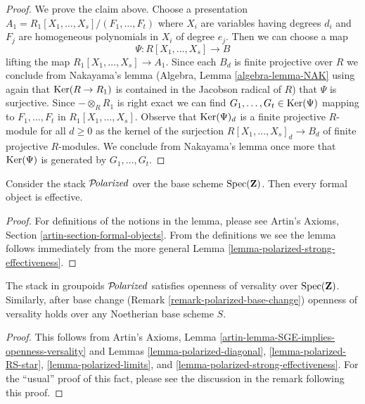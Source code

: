 \begin{proof}
\medskip\noindent
We prove the claim above.
Choose a presentation $A_1 = R_1[X_1, \ldots, X_s]/(F_1, \ldots, F_t)$
where $X_i$ are variables having degrees $d_i$ and $F_j$
are homogeneous polynomials in $X_i$ of degree $e_j$.
Then we can choose a map
$$
\Psi : R[X_1, \ldots, X_s] \longrightarrow B
$$
lifting the map $R_1[X_1, \ldots, X_s] \to A_1$. Since each $B_d$
is finite projective over $R$ we conclude from 
Nakayama's lemma (Algebra, Lemma \ref{algebra-lemma-NAK}
using again that $\mathop{\mathrm{Ker}}(R \to R_1)$ is contained in the Jacobson radical
of $R$) that $\Psi$ is surjective. Since $- \otimes_R R_1$ is right
exact we can find $G_1, \ldots, G_t \in \mathop{\mathrm{Ker}}(\Psi)$
mapping to $F_1, \ldots, F_t$ in $R_1[X_1, \ldots, X_s]$.
Observe that $\mathop{\mathrm{Ker}}(\Psi)_d$ is a finite projective $R$-module
for all $d \geq 0$ as the kernel of the surjection
$R[X_1, \ldots, X_s]_d \to B_d$ of finite projective $R$-modules.
We conclude from Nakayama's lemma once more that 
$\mathop{\mathrm{Ker}}(\Psi)$ is generated by $G_1, \ldots, G_t$.
\end{proof}

\begin{lemma}
\label{lemma-polarized-existence}
Consider the stack $\mathcal{P}\!\mathit{olarized}$ over the base
scheme $\mathop{\mathrm{Spec}}(\mathbf{Z})$. Then every formal object is effective.
\end{lemma}

\begin{proof}
For definitions of the notions in the lemma, please see
Artin's Axioms, Section \ref{artin-section-formal-objects}.
From the definitions we see the lemma follows immediately
from the more general Lemma \ref{lemma-polarized-strong-effectiveness}.
\end{proof}

\begin{lemma}
\label{lemma-polarized-defo-thy}
The stack in groupoids $\mathcal{P}\!\mathit{olarized}$
satisfies openness of versality over $\mathop{\mathrm{Spec}}(\mathbf{Z})$.
Similarly, after base change (Remark \ref{remark-polarized-base-change})
openness of versality holds over any Noetherian base scheme $S$.
\end{lemma}

\begin{proof}
This follows from
Artin's Axioms, Lemma \ref{artin-lemma-SGE-implies-openness-versality}
and Lemmas \ref{lemma-polarized-diagonal},
\ref{lemma-polarized-RS-star},
\ref{lemma-polarized-limits}, and
\ref{lemma-polarized-strong-effectiveness}.
For the ``usual'' proof of this fact, please see the discussion
in the remark following this proof.
\end{proof}

